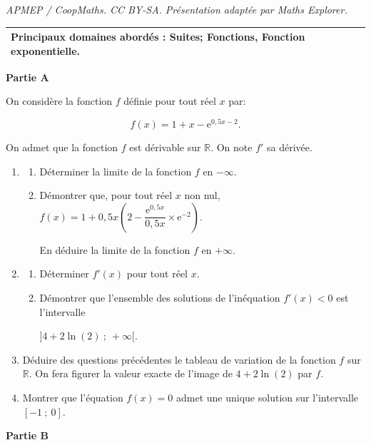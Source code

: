 \documentclass[10pt]{article}
\providecommand{\R}{\mathbb{R}}
\begin{document}
\noindent\textit{APMEP / CoopMaths. CC BY-SA. Présentation adaptée par Maths Explorer.}\par\medskip
\medskip

\begin{tabularx}{\linewidth}{|X|}\hline
\textbf{Principaux domaines abordés :} Suites;
Fonctions, Fonction exponentielle.\\ \hline
\end{tabularx}

\bigskip

\textbf{Partie A}

\medskip

On considère la fonction $f$ définie pour tout réel $x$ par:

\[f(x) = 1+x - \text{e}^{0,5x - 2}.\]

On admet que la fonction $f$ est dérivable sur $\R$. On note $f'$ sa dérivée.

\medskip

\begin{enumerate}
\item 
	\begin{enumerate}
		\item Déterminer la limite de la fonction $f$ en $- \infty$.
		\item Démontrer que, pour tout réel $x$ non nul, $f(x) = 1+ 0,5x\left(2 - \dfrac{\text{e}^{0,5x}}{0,5x} \times \text{e}^{-2}\right)$.
		
En déduire la limite de la fonction $f$ en $+\infty$.
	\end{enumerate}
\item 
	\begin{enumerate}
		\item Déterminer $f'(x)$ pour tout réel $x$.
		\item Démontrer que l'ensemble des solutions de l'inéquation $f'(x) < 0$ est l'intervalle

$]4 + 2\ln (2)~;~+\infty[$.
	\end{enumerate}	
\item Déduire des questions précédentes le tableau de variation de la fonction $f$ sur $\R$. On fera figurer la valeur exacte de l'image de $4 + 2\ln (2)$ par $f$.
\item Montrer que l'équation $f(x) = 0$ admet une unique solution sur l'intervalle $[-1~;~0]$.
\end{enumerate}

\bigskip

\textbf{Partie B}
\end{document}
